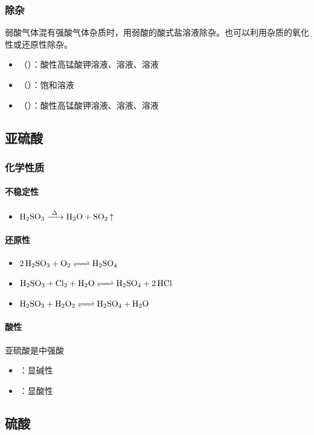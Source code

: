 \documentclass[a4paper]{article}
\begin{document}
	\subsubsection{除杂}
	弱酸气体混有强酸气体杂质时，用弱酸的酸式盐溶液除杂。也可以利用杂质的氧化性或还原性除杂。
	\begin{itemize}
		\item {}（）：酸性高锰酸钾溶液、溶液、溶液
		\item {}（）：饱和溶液
		\item {}（）：酸性高锰酸钾溶液、溶液、溶液
	\end{itemize}
	
	\subsection{亚硫酸}
	\subsubsection{化学性质}
	\paragraph{不稳定性}
	\begin{itemize}
		\item $\ce{H2SO3 ->[\Delta] H2O + SO2 ^}$
	\end{itemize}
	\paragraph{还原性}
	\begin{itemize}
		\item $\ce{2H2SO3 + O2 <=> H2SO4}$
		\item $\ce{H2SO3 + Cl2 + H2O <=> H2SO4 + 2HCl}$
		\item $\ce{H2SO3 + H2O2 <=> H2SO4 + H2O}$
	\end{itemize}
	\paragraph{酸性}
	亚硫酸是中强酸
	\begin{itemize}
		\item {}：显碱性
		\item {}：显酸性
	\end{itemize}
	
	\subsection{硫酸}
\end{document}
